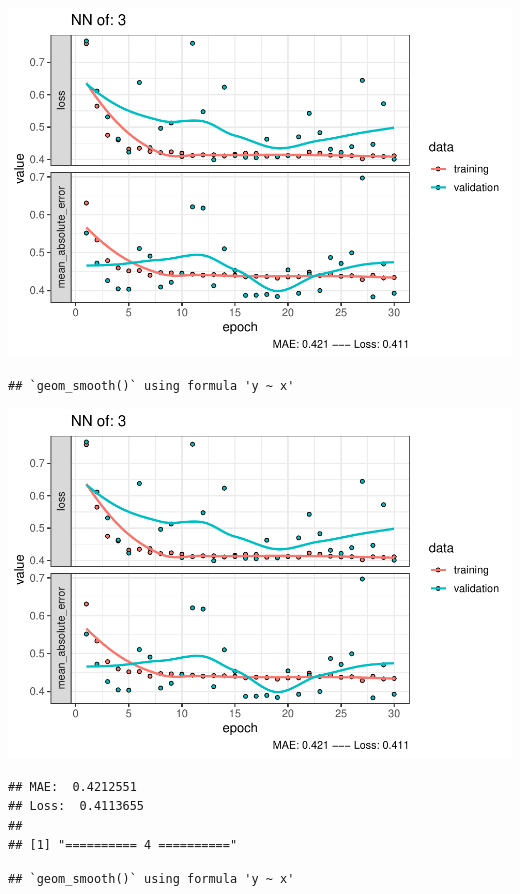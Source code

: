 \documentclass[
]{article}
\begin{document}
\includegraphics{project-code_files/figure-latex/unnamed-chunk-18-5.pdf}

\begin{verbatim}
## `geom_smooth()` using formula 'y ~ x'
\end{verbatim}

\includegraphics{project-code_files/figure-latex/unnamed-chunk-18-6.pdf}

\begin{verbatim}
## MAE:  0.4212551
## Loss:  0.4113655 
## 
## [1] "========== 4 =========="
\end{verbatim}

\begin{verbatim}
## `geom_smooth()` using formula 'y ~ x'
\end{verbatim}
\end{document}
